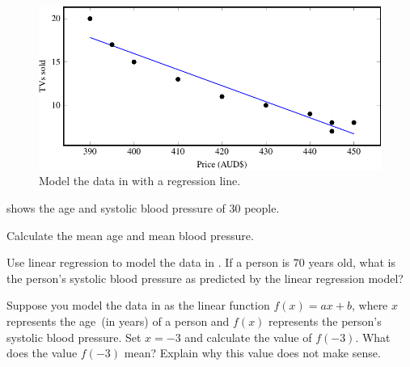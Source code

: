 \documentclass[a4paper,oneside,12pt]{article}
\begin{document}
\begin{table}[!htbp]
\centering

\caption{%
  Details of how to use the formulae
  in~\eqref{eqn:linear_regression_alpha_hat_beta_hat} to calculate the
  regression line for the data in .  In most cases,
  you would need to round a number to two, four, or six decimal places
  in order to fit a table.  However, you should not round a number
  when you are calculating the values for $\alphahat$ and $\betahat$.
  The rounding should only be done after you have calculated the
  values for $\alphahat$ and $\betahat$.
}
\label{tab:fantastic_tv_details_regression_line}
\end{table}

\begin{figure}[!htbp]
\centering
\includegraphics[scale=1]{image/07/fantastic-tv-regression.pdf}
\caption{%
  Model the data in  with a regression line.
}
\label{fig:fantastic_tv_regression}
\end{figure}

\begin{table}[!htbp]
\centering

\caption{%
  The age~(in years) and systolic blood pressure of $30$ people.
}
\label{tab:blood_pressure}
\end{table}

\begin{example}
 shows the age and systolic blood pressure
of $30$ people.
\begin{packedenum}
\item\label{subex:blood_pressure_mean_age_pressure}
  Calculate the mean age and mean blood pressure.

\item\label{subex:blood_pressure_linear_regression}
  Use linear regression to model the data in
  .  If a person is $70$ years old, what is
  the person's systolic blood pressure as predicted by the linear
  regression model?

\item\label{subex:blood_pressure_nonsense}
  Suppose you model the data in  as the
  linear function $f(x) = ax + b$, where $x$ represents the age~(in
  years) of a person and $f(x)$ represents the person's systolic blood
  pressure.  Set $x = -3$ and calculate the value of $f(-3)$.  What
  does the value $f(-3)$ mean?  Explain why this value does not make
  sense.
\end{packedenum}
\end{example}
\end{document}
